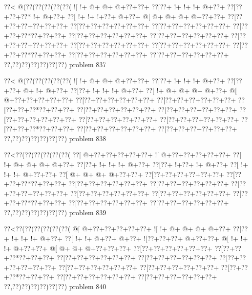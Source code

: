 \vbox{\vbox{\goo
\0??<\- @(\0??(\0??(\0??(\0??(\0??(
\- ![\- !+\- @+\- @+\- @+\0??+\0??+
\0??[\0??+\- !+\- !+\- !+\- @+\0??+
\0??[\0??+\0??+\0??*\- !+\- @+\0??+
\0??[\- !+\- !+\- !+\0??+\- @+\0??+
\- @[\- @+\- @+\- @+\- @+\0??+\0??+
\0??[\0??+\0??+\0??+\0??+\0??+\0??+
\0??[\0??+\0??+\0??+\0??+\0??+\0??+
\0??[\0??+\0??+\0??+\0??+\0??+\0??+
\0??[\0??+\0??+\0??*\0??+\0??+\0??+
\0??[\0??+\0??+\0??+\0??+\0??+\0??+
\0??[\0??+\0??+\0??+\0??+\0??+\0??+
\0??[\0??+\0??+\0??+\0??+\0??+\0??+
\0??[\0??+\0??+\0??+\0??+\0??+\0??+
\0??[\0??+\0??+\0??+\0??+\0??+\0??+
\0??[\0??+\0??+\0??*\0??+\0??+\0??+
\0??[\0??+\0??+\0??+\0??+\0??+\0??+
\0??[\0??+\0??+\0??+\0??+\0??+\0??+
\0??,\0??)\0??)\0??)\0??)\0??)\0??)
}
\hfil problem 837\hfil\break
}

\vbox{\vbox{\goo
\0??<\- @(\0??(\0??(\0??(\0??(\0??(
\- ![\- !+\- @+\- @+\- @+\0??+\0??+
\0??[\0??+\- !+\- !+\- !+\- @+\0??+
\0??[\0??+\0??+\- @+\- !+\- @+\0??+
\0??[\0??+\- !+\- !+\- !+\- @+\0??+
\0??[\- !+\- @+\- @+\- @+\- @+\0??+
\- @[\- @+\0??+\0??+\0??+\0??+\0??+
\0??[\0??+\0??+\0??+\0??+\0??+\0??+
\0??[\0??+\0??+\0??+\0??+\0??+\0??+
\0??[\0??+\0??+\0??*\0??+\0??+\0??+
\0??[\0??+\0??+\0??+\0??+\0??+\0??+
\0??[\0??+\0??+\0??+\0??+\0??+\0??+
\0??[\0??+\0??+\0??+\0??+\0??+\0??+
\0??[\0??+\0??+\0??+\0??+\0??+\0??+
\0??[\0??+\0??+\0??+\0??+\0??+\0??+
\0??[\0??+\0??+\0??*\0??+\0??+\0??+
\0??[\0??+\0??+\0??+\0??+\0??+\0??+
\0??[\0??+\0??+\0??+\0??+\0??+\0??+
\0??,\0??)\0??)\0??)\0??)\0??)\0??)
}
\hfil problem 838\hfil\break
}

\vbox{\vbox{\goo
\0??<\0??(\0??(\0??(\0??(\0??(\0??(
\0??[\- @+\0??+\0??+\0??+\0??+\0??+
\- ![\- @+\0??+\0??+\0??+\0??+\0??+
\0??[\- !+\- @+\- @+\- @+\- @+\0??+
\0??[\0??+\- !+\- !+\- !+\- @+\0??+
\0??[\0??+\- !+\0??+\- !+\- @+\0??+
\0??[\- !+\- !+\- !+\- @+\0??+\0??+
\0??[\- @+\- @+\- @+\- @+\0??+\0??+
\0??[\0??+\0??+\0??+\0??+\0??+\0??+
\0??[\0??+\0??+\0??*\0??+\0??+\0??+
\0??[\0??+\0??+\0??+\0??+\0??+\0??+
\0??[\0??+\0??+\0??+\0??+\0??+\0??+
\0??[\0??+\0??+\0??+\0??+\0??+\0??+
\0??[\0??+\0??+\0??+\0??+\0??+\0??+
\0??[\0??+\0??+\0??+\0??+\0??+\0??+
\0??[\0??+\0??+\0??*\0??+\0??+\0??+
\0??[\0??+\0??+\0??+\0??+\0??+\0??+
\0??[\0??+\0??+\0??+\0??+\0??+\0??+
\0??,\0??)\0??)\0??)\0??)\0??)\0??)
}
\hfil problem 839\hfil\break
}

\vbox{\vbox{\goo
\0??<\0??(\0??(\0??(\0??(\0??(\0??(
\- @[\- @+\0??+\0??+\0??+\0??+\0??+
\- ![\- !+\- @+\- @+\- @+\- @+\0??+
\0??[\0??+\- !+\- !+\- !+\- @+\0??+
\0??[\- !+\- !+\- @+\0??+\- @+\0??+
\- ![\0??+\0??+\0??+\- @+\0??+\0??+
\- @[\- !+\- !+\- !+\- @+\0??+\0??+
\- @[\- @+\- @+\- @+\0??+\0??+\0??+
\0??[\0??+\0??+\0??+\0??+\0??+\0??+
\0??[\0??+\0??+\0??*\0??+\0??+\0??+
\0??[\0??+\0??+\0??+\0??+\0??+\0??+
\0??[\0??+\0??+\0??+\0??+\0??+\0??+
\0??[\0??+\0??+\0??+\0??+\0??+\0??+
\0??[\0??+\0??+\0??+\0??+\0??+\0??+
\0??[\0??+\0??+\0??+\0??+\0??+\0??+
\0??[\0??+\0??+\0??*\0??+\0??+\0??+
\0??[\0??+\0??+\0??+\0??+\0??+\0??+
\0??[\0??+\0??+\0??+\0??+\0??+\0??+
\0??,\0??)\0??)\0??)\0??)\0??)\0??)
}
\hfil problem 840\hfil\break
}

